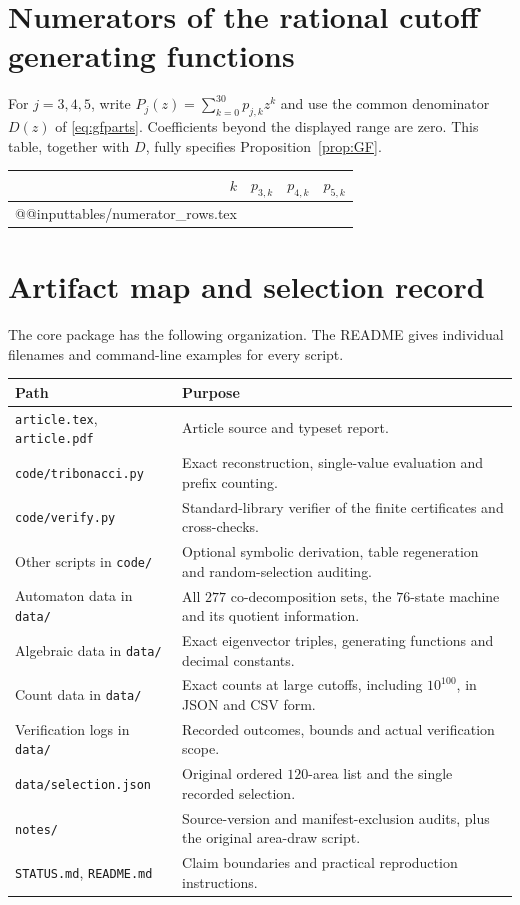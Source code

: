 \documentclass[11pt,a4paper]{article}
\theoremstyle{definition}
\theoremstyle{remark}
\newcommand{\code}[1]{\texttt{#1}}
\begin{document}
\section{Numerators of the rational cutoff generating functions}
\label{app:numerators}
For $j=3,4,5$, write $P_j(z)=\sum_{k=0}^{30}p_{j,k}z^k$ and use the common
denominator $D(z)$ of \eqref{eq:gfparts}. Coefficients beyond the displayed
range are zero. This table, together with $D$, fully specifies
Proposition~\ref{prop:GF}.
\begin{center}
\small
\setlength{\tabcolsep}{14pt}
\renewcommand{\arraystretch}{1.10}
\begin{tabular}{@{}rrrr@{}}
\toprule
$k$ & $p_{3,k}$ & $p_{4,k}$ & $p_{5,k}$\\
\midrule
\csname @@input\endcsname tables/numerator_rows.tex 
\bottomrule
\end{tabular}
\end{center}

\clearpage
\section{Artifact map and selection record}
\label{app:artifacts}
The core package has the following organization. The README gives individual
filenames and command-line examples for every script.
\begin{center}
\small
\begin{tabular}{@{}p{}p{}@{}}
\toprule
Path & Purpose\\
\midrule
\code{article.tex}, \code{article.pdf} & Article source and typeset report.\\
\code{code/tribonacci.py} & Exact reconstruction, single-value evaluation and prefix counting.\\
\code{code/verify.py} & Standard-library verifier of the finite certificates and cross-checks.\\
Other scripts in \code{code/} & Optional symbolic derivation, table regeneration and random-selection auditing.\\
Automaton data in \code{data/} & All $277$ co-decomposition sets, the $76$-state machine and its quotient information.\\
Algebraic data in \code{data/} & Exact eigenvector triples, generating functions and decimal constants.\\
Count data in \code{data/} & Exact counts at large cutoffs, including $10^{100}$, in JSON and CSV form.\\
Verification logs in \code{data/} & Recorded outcomes, bounds and actual verification scope.\\
\code{data/selection.json} & Original ordered $120$-area list and the single recorded selection.\\
\code{notes/} & Source-version and manifest-exclusion audits, plus the original area-draw script.\\
\code{STATUS.md}, \code{README.md} & Claim boundaries and practical reproduction instructions.\\
\bottomrule
\end{tabular}
\end{center}
\end{document}
